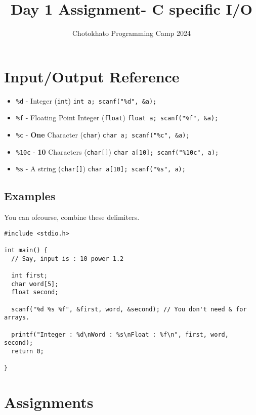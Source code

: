 \documentclass{article}
\title{Day 1 Assignment- C specific I/O}
\author{Chotokhato Programming Camp 2024}
\begin{document}
\maketitle

\section*{Input/Output Reference}

\begin{itemize}
  \item \verb|%d| - Integer (\verb|int|) \lstinline{int a; scanf("%d", &a);}
  
  \item \verb|%f| - Floating Point Integer (\verb|float|) \lstinline{float a; scanf("%f", &a);}

  \item \verb|%c| - \textbf{One} Character (\verb|char|) \lstinline{char a; scanf("%c", &a);}

  \item \verb|%10c| - \textbf{10} Characters (\verb|char[]|) \lstinline{char a[10]; scanf("%10c", a);}

  \item \verb|%s| - A string (\verb|char[]|) \lstinline{char a[10]; scanf("%s", a);}
\end{itemize}

\subsection*{Examples}
You can ofcourse, combine these delimiters.

\begin{lstlisting}
#include <stdio.h>

int main() {
  // Say, input is : 10 power 1.2

  int first;
  char word[5];
  float second;

  scanf("%d %s %f", &first, word, &second); // You don't need & for arrays.

  printf("Integer : %d\nWord : %s\nFloat : %f\n", first, word, second);
  return 0;

}
\end{lstlisting}

\section*{Assignments}
\end{document}
